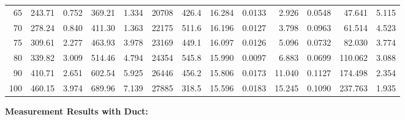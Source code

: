 \documentclass[10pt]{article}
\begin{document}
{\begin{tabular}{|r|rr|rr|rr|rr|rr|r|r|}
       65 &       243.71 &        0.752 &       369.21 &        1.334 &        20708 &        426.4 &       16.284 &       0.0133 &        2.926 &       0.0548 &       47.641 &        5.115 \\
       70 &       278.24 &        0.840 &       411.30 &        1.363 &        22175 &        511.6 &       16.196 &       0.0127 &        3.798 &       0.0963 &       61.514 &        4.523 \\
       75 &       309.61 &        2.277 &       463.93 &        3.978 &        23169 &        449.1 &       16.097 &       0.0126 &        5.096 &       0.0732 &       82.030 &        3.774 \\
       80 &       339.82 &        3.009 &       514.46 &        4.794 &        24354 &        545.8 &       15.990 &       0.0097 &        6.883 &       0.0699 &      110.062 &        3.088 \\
       90 &       410.71 &        2.651 &       602.54 &        5.925 &        26446 &        456.2 &       15.806 &       0.0173 &       11.040 &       0.1127 &      174.498 &        2.354 \\
      100 &       460.15 &        3.974 &       689.96 &        7.139 &        27885 &        318.5 &       15.596 &       0.0183 &       15.245 &       0.1090 &      237.763 &        1.935 \\
\hline
\end{tabular}
}


\vspace{3mm}

\noindent
{\large \bf Measurement Results with Duct:}
\vspace{3mm}
\end{document}
